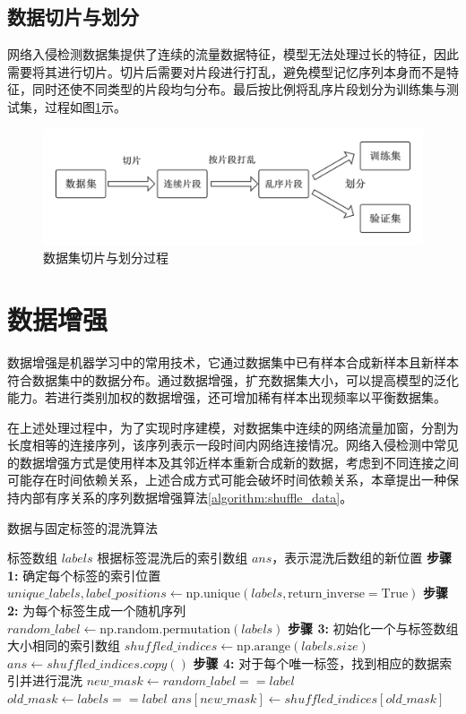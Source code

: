 \subsection{数据切片与划分}
网络入侵检测数据集提供了连续的流量数据特征，模型无法处理过长的特征，因此需要将其进行切片。切片后需要对片段进行打乱，避免模型记忆序列本身而不是特征，同时还使不同类型的片段均匀分布。最后按比例将乱序片段划分为训练集与测试集，过程如图\ref{fig:divide_slice}示。

\begin{figure}[htbp]
\centering %
\includegraphics[width=1\linewidth]{img/preprocessing/divide_slice.pdf} %
\caption{数据集切片与划分过程}
\label{fig:divide_slice} %
\end{figure}%

\section{数据增强}
数据增强是机器学习中的常用技术，它通过数据集中已有样本合成新样本且新样本符合数据集中的数据分布。通过数据增强，扩充数据集大小，可以提高模型的泛化能力。若进行类别加权的数据增强，还可增加稀有样本出现频率以平衡数据集。

在上述处理过程中，为了实现时序建模，对数据集中连续的网络流量加窗，分割为长度相等的连接序列，该序列表示一段时间内网络连接情况。网络入侵检测中常见的数据增强方式是使用样本及其邻近样本重新合成新的数据，考虑到不同连接之间可能存在时间依赖关系，上述合成方式可能会破坏时间依赖关系，本章提出一种保持内部有序关系的序列数据增强算法\ref{algorithm:shuffle_data}。

\begin{algorithm}[htbp]
\caption{数据与固定标签的混洗算法}
\begin{algorithmic}
\REQUIRE 标签数组 $labels$
\ENSURE 根据标签混洗后的索引数组 $ans$，表示混洗后数组的新位置
\STATE \textbf{步骤 1:} 确定每个标签的索引位置
\STATE $unique\_labels, label\_positions \gets \mathrm{np.unique}(labels, \mathrm{return\_inverse=True})$
\STATE \textbf{步骤 2:} 为每个标签生成一个随机序列
\STATE $random\_label \gets \mathrm{np.random.permutation}(labels)$
\STATE \textbf{步骤 3:} 初始化一个与标签数组大小相同的索引数组
\STATE $shuffled\_indices \gets \mathrm{np.arange}(labels.size)$
\STATE $ans \gets shuffled\_indices.copy()$
\STATE \textbf{步骤 4:} 对于每个唯一标签，找到相应的数据索引并进行混洗
    \STATE $new\_mask \gets random\_label == label$
    \STATE $old\_mask \gets labels == label$
    \STATE $ans[new\_mask] \gets shuffled\_indices[old\_mask]$
\ENDFOR
\end{algorithmic}
\label{algorithm:shuffle_data}
\end{algorithm}


